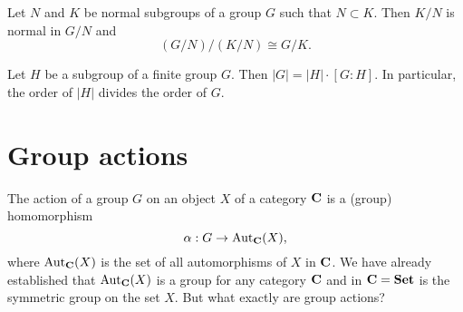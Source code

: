 \begin{theorem}
    \label{thm:third-isomorphism}
    Let \(N\) and \(K\) be normal subgroups of a group \(G\) such that \(N
    \subset K\). Then \(K/N\) is normal in \(G/N\) and
    \[
        (G/N)/(K/N) \cong G/K.
    \]
\end{theorem}


\begin{theorem}
    Let \(H\) be a subgroup of a finite group \(G\). Then \(|G| = |H| \cdot [G :
    H]\). In particular, the order of \(|H|\) divides the order of \(G\).
\end{theorem}

\section{Group actions}

The action of a group \(G\) on an object \(X\) of a category \(\mathbf{C}\) is a
(group) homomorphism
\[
    \alpha: G \to \operatorname{Aut}_{\mathbf{C}}(X),
\]
where \(\operatorname{Aut}_{\mathbf{C}}(X)\) is the set of all automorphisms of \(X\) in
\(\mathbf{C}\). We have already established that \(\operatorname{Aut}_{\mathbf{C}}(X)\) is a group
for any category \(\mathbf{C}\) and in \(\mathbf{C} = \mathbf{Set}\) is the symmetric group
on the set \(X\). But what exactly are group actions?

